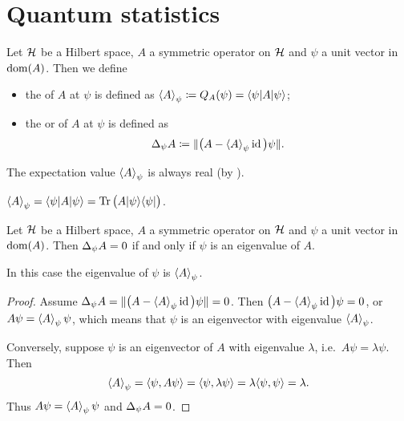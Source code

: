\section{Quantum statistics}
\begin{definition}
Let $\mathcal{H}$ be a Hilbert space, $A$ a symmetric operator on $\mathcal{H}$ and $\psi$ a unit vector in $\operatorname{dom}(A)$. Then we define
\begin{itemize}
\item the  of $A$ at $\psi$ is defined as $\expval{A}_\psi \defeq Q_A(\psi) = \braket[A]{\psi}{\psi}$;
\item the  or  of $A$ at $\psi$ is defined as
\[ \Delta_\psi A \coloneqq \lVert\big(A - \left\langle A \right\rangle_\psi\operatorname{id}\big)\psi\rVert. \]
\end{itemize}
\end{definition}
The expectation value $\left\langle A \right\rangle_\psi$ is always real (by ).

\begin{lemma}
$\expval{A}_\psi = \braket[A]{\psi}{\psi} = \Tr\big(A\ketbra{\psi}{\psi}\big)$.
\end{lemma}

\begin{lemma}
Let $\mathcal{H}$ be a Hilbert space, $A$ a symmetric operator on $\mathcal{H}$ and $\psi$ a unit vector in $\operatorname{dom}(A)$. Then $\Delta_\psi A = 0$ \textup{if and only if} $\psi$ is an eigenvalue of $A$.

In this case the eigenvalue of $\psi$ is $\left\langle A \right\rangle_\psi$.
\end{lemma}
\begin{proof}
Assume $\Delta_\psi A = \lVert\big(A - \left\langle A \right\rangle_\psi\operatorname{id}\big)\psi\rVert = 0$. Then $\big(A - \left\langle A \right\rangle_\psi\operatorname{id}\big)\psi = 0$, or $A\psi = \left\langle A \right\rangle_\psi\psi$, which means that $\psi$ is an eigenvector with eigenvalue $\left\langle A \right\rangle_\psi$.

Conversely, suppose $\psi$ is an eigenvector of $A$ with eigenvalue $\lambda$, i.e.\ $A\psi = \lambda \psi$. Then
\[ \expval{A}_\psi = \inner{\psi, A\psi} = \inner{\psi, \lambda\psi} = \lambda\inner{\psi,\psi} = \lambda. \]
Thus $A\psi = \left\langle A \right\rangle_\psi\psi$ and $\Delta_\psi A = 0$.
\end{proof}

